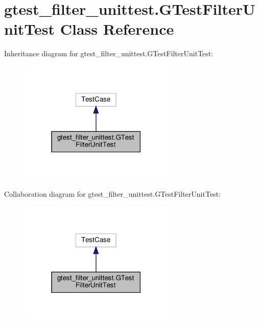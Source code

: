 \hypertarget{classgtest__filter__unittest_1_1_g_test_filter_unit_test}{}\section{gtest\+\_\+filter\+\_\+unittest.\+G\+Test\+Filter\+Unit\+Test Class Reference}
\label{classgtest__filter__unittest_1_1_g_test_filter_unit_test}


Inheritance diagram for gtest\+\_\+filter\+\_\+unittest.\+G\+Test\+Filter\+Unit\+Test\+:
\nopagebreak
\begin{figure}[H]
\begin{center}
\leavevmode
\includegraphics[width=210pt]{classgtest__filter__unittest_1_1_g_test_filter_unit_test__inherit__graph}
\end{center}
\end{figure}


Collaboration diagram for gtest\+\_\+filter\+\_\+unittest.\+G\+Test\+Filter\+Unit\+Test\+:
\nopagebreak
\begin{figure}[H]
\begin{center}
\leavevmode
\includegraphics[width=210pt]{classgtest__filter__unittest_1_1_g_test_filter_unit_test__coll__graph}
\end{center}
\end{figure}
